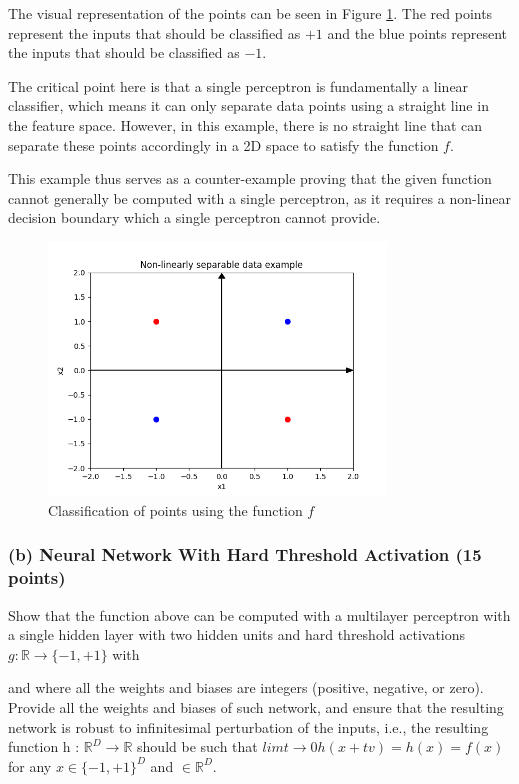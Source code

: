 \documentclass{article}
\begin{document}
The visual representation of the points can be seen in Figure \ref{fig:points}. The red points represent the inputs that should be classified as \( +1 \) and the blue points represent the inputs that should be classified as \( -1 \).

The critical point here is that a single perceptron is fundamentally a linear classifier, which means it can only separate data points using a straight line in the feature space. However, in this example, there is no straight line that can separate these points accordingly in a 2D space to satisfy the function \( f \).

This example thus serves as a counter-example proving that the given function cannot generally be computed with a single perceptron, as it requires a non-linear decision boundary which a single perceptron cannot provide. 

\begin{figure}[H]
    \centering
    \includegraphics[width=0.8\textwidth]{"3a.png"}
    \caption{Classification of points using the function \( f \)}
    \label{fig:points}
\end{figure}

\subsubsection*{(b) Neural Network With Hard Threshold Activation (15 points)}

Show that the function above can be computed with a multilayer perceptron with a single hidden layer with two hidden 
units and hard threshold activations \(g: \mathbb{R} \rightarrow \{-1,+1\}\) with

and where all the weights and biases are integers (positive, negative, or zero). Provide all the weights and biases of such network, and ensure 
that the resulting network is robust to infinitesimal perturbation of the inputs, i.e., the resulting function 
h : $\mathbb{R}^{D} \rightarrow \mathbb{R}$ should be such that $limt \rightarrow 0 h(x+tv) = h(x) = f(x)$ for 
any $x \in \{-1,+1\}^{D}$ and $\in \mathbb{R}^{D}.$
\end{document}
